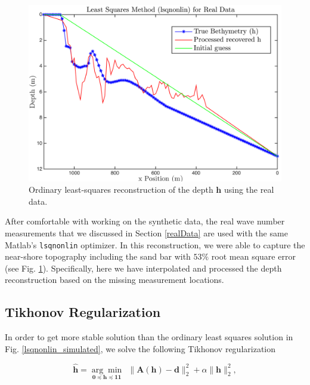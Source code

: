 \begin{figure}[H]
\center
\includegraphics[scale=0.6]{img/lsqnonlin_real_data_oct09.png} %
\caption{Ordinary least-squares reconstruction of the depth $\mathbf{h}$ using the real data.}
\label{lsqnonlin_real}
\end{figure}

After comfortable with working on the synthetic data, the real wave number measurements that we discussed in Section \ref{realData} are used with the same Matlab's \verb|lsqnonlin| optimizer. In this reconstruction, we were able to capture the near-shore topography including the sand bar with $53\%$ root mean square error (see Fig. \ref{lsqnonlin_real}). Specifically, here we have interpolated and processed the depth reconstruction based on the missing measurement locations. 


\subsection{Tikhonov Regularization} \label{TickReg}

In order to get more stable solution than the ordinary least squares solution in Fig. \ref{lsqnonlin_simulated}, we solve the following Tikhonov regularization

\begin{equation}\label{LS-regBC}
\mathbf{\hat{h}} = \underset{\mathbf{0} \preceq \mathbf{h} \preceq \mathbf{11}}{\arg \min} \ \ \|  \mathbf{A}(\mathbf{h}) -  \mathbf{d} \|_2^2  +  \alpha \| \mathbf{h}\|_2^2,
\end{equation}


